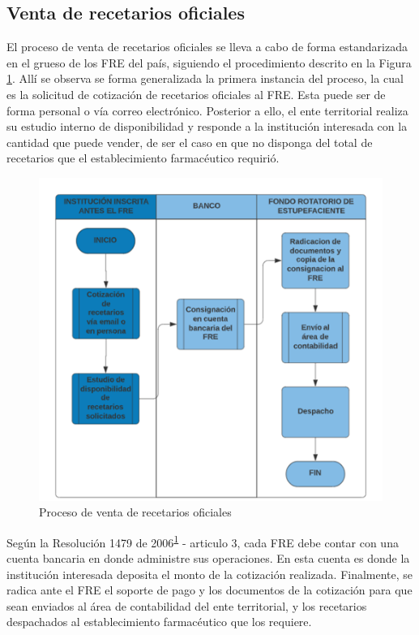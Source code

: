 \documentclass[
]{book}
\begin{document}
\hypertarget{venta-de-recetarios-oficiales}{%
\subsection{Venta de recetarios oficiales}\label{venta-de-recetarios-oficiales}}

El proceso de venta de recetarios oficiales se lleva a cabo de forma estandarizada en el grueso de los FRE del país, siguiendo el procedimiento descrito en la Figura \ref{fig:procesoVentaRec}. Allí se observa se forma generalizada la primera instancia del proceso, la cual es la solicitud de cotización de recetarios oficiales al FRE. Esta puede ser de forma personal o vía correo electrónico. Posterior a ello, el ente territorial realiza su estudio interno de disponibilidad y responde a la institución interesada con la cantidad que puede vender, de ser el caso en que no disponga del total de recetarios que el establecimiento farmacéutico requirió.

\begin{figure}

{\centering \includegraphics[width=0.8\linewidth]{figures/procesoVentaREC} 

}

\caption{Proceso de venta de recetarios oficiales}\label{fig:procesoVentaRec}
\end{figure}

Según la Resolución 1479 de 2006\textsuperscript{\protect\hyperlink{ref-MSPS1479-2006}{1}} - articulo 3, cada FRE debe contar con una cuenta bancaria en donde administre sus operaciones. En esta cuenta es donde la institución interesada deposita el monto de la cotización realizada. Finalmente, se radica ante el FRE el soporte de pago y los documentos de la cotización para que sean enviados al área de contabilidad del ente territorial, y los recetarios despachados al establecimiento farmacéutico que los requiere.
\end{document}
